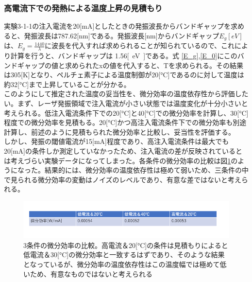 \documentclass[titlepage]{jsarticle}
\begin{document}
\subsubsection{高電流下での発熱による温度上昇の見積もり}
実験3-1-1の注入電流を20[mA]としたときの発振波長からバンドギャップを求めると、発振波長は787.62[\si{nm}]である。発振波長[\si{nm}]からバンドギャップ$E_g[\si{eV}]$は、$E_g=\frac{1440}{\lambda}$に波長を代入すれば求められることが知られているので、これにより計算を行うと、バンドギャップは
1.56\si{[eV]}である。式
\ref{E_g},\ref{E_0}にこのバンドギャップの値と求められたxの値を代入すると、Tを求められる。その結果は305[K]となり、ペルチェ素子による温度制御が20[\si{\degreeCelsius}]であるのに対して温度は約32[\si{\degreeCelsius}]まで上昇していることが分かる。\\
このようにして推定された温度の妥当性を、微分効率の温度依存性から評価したい。まず、レーザ発振領域で注入電流が小さい状態では温度変化が十分小さいと考えられる。低注入電流条件下での20[\si{\degreeCelsius}]と40[\si{\degreeCelsius}]での微分効率を計算し、30[\si{\degreeCelsius}]程度での微分効率を見積もる。20[\si{\degreeCelsius}]かつ高注入電流条件下での微分効率も別途計算し、前述のように見積もられた微分効率と比較し、妥当性を評価する。\\
しかし、発振の閾値電流が15[\si{mA}]程度であり、高注入電流条件は最大でも20[\si{mA}]の条件しか測定していなかったため、注入電流の差が反映されているとは考えづらい実験データになってしまった。各条件の微分効率の比較は図\ref{fig:stimulate_T}のようになった。結果的には、微分効率の温度依存性は極めて弱いため、三条件の中で見られる微分効率の変動はノイズのレベルであり、有意な差ではないと考えられる。
\begin{figure}[htbp]
 \begin{minipage}{0.5\hsize}
  \begin{center}
   \includegraphics[width=160mm]{stimulate_T.png}
  \end{center}
  \caption{3条件の微分効率の比較。高電流＆20[\si{\degreeCelsius}]の条件は見積もりによると低電流＆30[\si{\degreeCelsius}]の微分効率と一致するはずであり、そのような結果となっているが、微分効率の温度依存性はこの温度幅では極めて低いため、有意なものではないと考えられる}
  \label{fig:stimulate_T} \end{minipage}
\end{figure}
\end{document}
